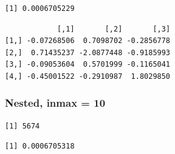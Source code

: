 \documentclass[
  12pt,
  letterpaper,
  DIV=11,
  numbers=noendperiod]{scrartcl}
\newenvironment{Shaded}{\begin{snugshade}}{\end{snugshade}}
\newcommand{\AttributeTok}[1]{\textcolor[rgb]{0.40,0.45,0.13}{#1}}
\newcommand{\ConstantTok}[1]{\textcolor[rgb]{0.56,0.35,0.01}{#1}}
\newcommand{\DecValTok}[1]{\textcolor[rgb]{0.68,0.00,0.00}{#1}}
\newcommand{\FunctionTok}[1]{\textcolor[rgb]{0.28,0.35,0.67}{#1}}
\newcommand{\NormalTok}[1]{\textcolor[rgb]{0.00,0.23,0.31}{#1}}
\newcommand{\OtherTok}[1]{\textcolor[rgb]{0.00,0.23,0.31}{#1}}
\newcommand{\SpecialCharTok}[1]{\textcolor[rgb]{0.37,0.37,0.37}{#1}}
\begin{document}
\begin{verbatim}
[1] 0.0006705229
\end{verbatim}

\begin{Shaded}
\end{Shaded}

\begin{verbatim}
            [,1]       [,2]       [,3]
[1,] -0.07268506  0.7098702 -0.2856778
[2,]  0.71435237 -2.0877448 -0.9185993
[3,] -0.09053604  0.5701999 -0.1165041
[4,] -0.45001522 -0.2910987  1.8029850
\end{verbatim}

\subsubsection{Nested, inmax = 10}\label{nested-inmax-10}

\begin{Shaded}
\end{Shaded}

\begin{verbatim}
[1] 5674
\end{verbatim}

\begin{Shaded}
\end{Shaded}

\begin{verbatim}
[1] 0.0006705318
\end{verbatim}

\begin{Shaded}
\end{Shaded}
\end{document}
